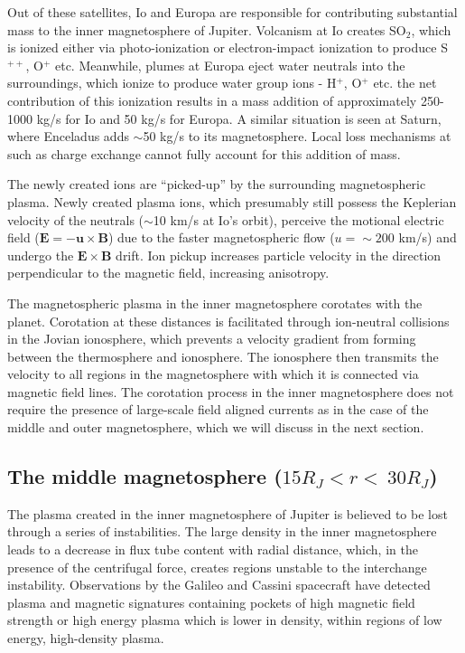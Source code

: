 Out of these satellites, Io and Europa are responsible for contributing substantial mass to the inner magnetosphere of Jupiter. Volcanism at Io creates SO$_2$, which is ionized either via photo-ionization or electron-impact ionization to produce S$^{++}$, O$^+$ etc. Meanwhile, plumes at Europa eject water neutrals into the surroundings, which ionize to produce water group ions - H$^+$, O$^+$ etc. the net contribution of this ionization results in a mass addition of approximately 250-1000 kg/s for Io and 50 kg/s for Europa. A similar situation is seen at Saturn, where Enceladus adds $\sim$50 kg/s to its magnetosphere. Local loss mechanisms at such as charge exchange cannot fully account for this addition of mass. 

The newly created ions are ``picked-up'' by the surrounding magnetospheric plasma. Newly created plasma ions, which presumably still possess the Keplerian velocity of the neutrals ($\sim$10 km/s at Io's orbit), perceive the motional electric field ($\mathbf{E} = -\mathbf{u} \times \mathbf{B}$) due to the faster magnetospheric flow ($u=\sim200$ km/s) and undergo the $\mathbf{E} \times \mathbf{B}$ drift. Ion pickup increases particle velocity in the direction perpendicular to the magnetic field, increasing anisotropy. 

The magnetospheric plasma in the inner magnetosphere corotates with the planet. Corotation at these distances is facilitated through ion-neutral collisions in the Jovian ionosphere, which prevents a velocity gradient from forming between the thermosphere and ionosphere. The ionosphere then transmits the velocity to all regions in the magnetosphere with which it is connected via magnetic field lines. The corotation process in the inner magnetosphere does not require the presence of large-scale field aligned currents as in the case of the middle and outer magnetosphere, which we will discuss in the next section. 

\subsection{The middle magnetosphere (\texorpdfstring{$15 R_J < r < ~30 R_J$)}{15<r<30}}
The plasma created in the inner magnetosphere of Jupiter is believed to be lost through a series of instabilities. The large density in the inner magnetosphere leads to a decrease in flux tube content with radial distance, which, in the presence of the centrifugal force, creates regions unstable to the interchange instability. Observations by the Galileo and Cassini spacecraft have detected plasma and magnetic signatures containing pockets of high magnetic field strength or high energy plasma which is lower in density, within regions of low energy, high-density plasma. 

